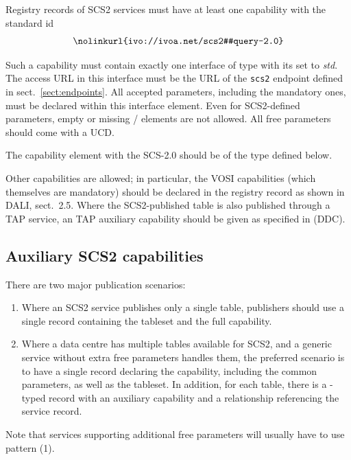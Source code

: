 \documentclass[11pt,a4paper]{ivoa}
\begin{document}
Registry records of SCS2 services must have at least one capability with
the standard id
$$
\hbox{\nolinkurl{ivo://ivoa.net/scs2#query-2.0}}
$$

Such a capability must contain exactly one interface of type
 with its  set to \emph{std}.  The
access URL in this interface must be the URL of the \verb|scs2| endpoint
defined in sect.~\ref{sect:endpoints}.  All
accepted parameters, including the mandatory ones, must be declared
within this interface element.  Even for SCS2-defined parameters, empty
or missing / elements
are not allowed.  All free
parameters should come with a UCD.

The capability element with the SCS-2.0  should be of
the type  defined below.

Other capabilities are allowed; in particular, the VOSI capabilities
(which themselves are mandatory) should be declared in the registry
record as shown in DALI, sect.~2.5.  Where the SCS2-published table is
also published through a TAP service, an TAP auxiliary capability
should be given as specified in \citet{2019ivoa.spec.0520D} (DDC).

\subsection{Auxiliary SCS2 capabilities}

There are two major publication scenarios:

\begin{enumerate}
\item Where an SCS2 service publishes only a single table, publishers
should use a single  record containing the
tableset and the full capability.

\item Where a data centre has multiple tables available for SCS2, and a
generic service without extra free parameters handles them, the
preferred scenario is to have a single  record
declaring the capability, including the common parameters, as well as
the tableset.  In addition, for each table, there is a
-typed record with an auxiliary capability and
a relationship referencing the service record.

\end{enumerate}

Note that services supporting additional free parameters will usually
have to use pattern (1).
\end{document}
